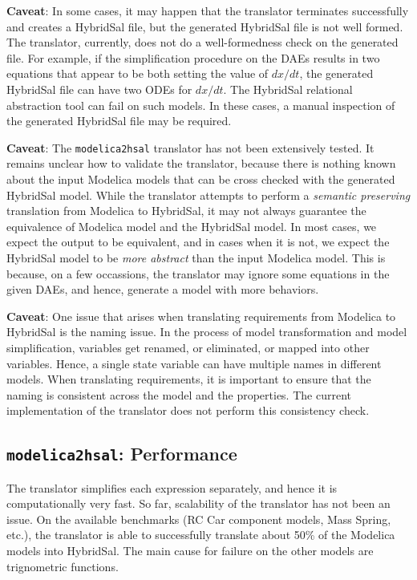 \documentclass{llncs}
\begin{document}
{\bf{Caveat}}: In some cases, it may happen that the translator terminates
successfully and creates a HybridSal file, but the generated HybridSal
file is not well formed.  The translator, currently, does not do a
well-formedness check on the generated file.  
For example, if the simplification procedure on the DAEs results in 
two equations that appear to be both setting the value of $dx/dt$,
the generated HybridSal file can have two ODEs for $dx/dt$.  The HybridSal
relational abstraction tool can fail on such models.
In these cases, a manual inspection of the generated HybridSal file
may be required.

{\bf{Caveat}}: The {\tt{modelica2hsal}} translator has not been extensively
tested.  It remains unclear how to validate the translator, because there
is nothing known about the input Modelica models that can be cross checked
with the generated HybridSal model.  
While the translator attempts to perform a {\em{semantic preserving}}
translation from Modelica to HybridSal, it may not always guarantee the
equivalence of Modelica model and the HybridSal model.
In most cases, we expect the output to be equivalent, and in cases when it 
is not, we expect the HybridSal model to be {\em{more abstract}} than the
input Modelica model.  This is because, on a few occassions, 
the translator may ignore some equations in the given DAEs, and hence,
generate a model with more behaviors.

{\bf{Caveat}}: One issue that arises when translating requirements from
Modelica to HybridSal is the naming issue.  In the process of model
transformation and model simplification, variables get renamed, or eliminated,
or mapped into other variables.  Hence, a single state variable can have
multiple names in different models.  When translating requirements,
it is important to ensure that the naming is consistent across the model
and the properties.  The current implementation of the translator does
not perform this consistency check.

\subsection{{\tt{modelica2hsal}}: Performance}

The translator simplifies each expression separately, and hence
it is computationally very fast.  So far, scalability of the
translator has not been an issue.  On the available benchmarks
(RC Car component models, Mass Spring, etc.), the translator is
able to successfully translate about 50\% of the Modelica models
into HybridSal.  The main cause for failure on the other models
are trignometric functions.
\end{document}
